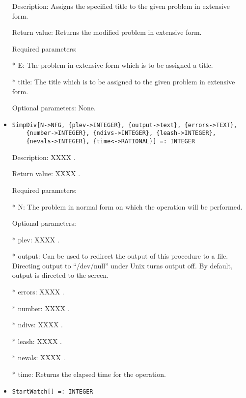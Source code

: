 \begin{itemize}
\bd
\item
[Description:] Assigns the specified title to the given problem in 
extensive form.
\item
[Return value:] Returns the modified problem in extensive form.
\item
[Required parameters:]\hfil\null
	
\bd
\item
[* E:] The problem in extensive form which is to be assigned a title.
\item
[* title:] The title which is to be assigned to the given problem in 
extensive form.
\ed

\item
[Optional parameters:] None.
\ed

\item
\begin{verbatim}
SimpDiv[N->NFG, {plev->INTEGER}, {output->text}, {errors->TEXT},
	{number->INTEGER}, {ndivs->INTEGER}, {leash->INTEGER}, 
	{nevals->INTEGER}, {time<->RATIONAL}] =: INTEGER
\end{verbatim}

\bd
\item
[Description:] XXXX .
\item
[Return value:] XXXX .
\item
[Required parameters:]\hfil\null

\bd
\item
[* N:] The problem in normal form on which the operation will be performed.
\ed

\item
[Optional parameters:]\hfil\null
	
\bd
\item
[* plev:]XXXX .
\item
[* output:] Can be used to redirect the output of this procedure to a
file.  Directing output to ``/dev/null'' under Unix turns 
output off.  By default, output is directed to the screen.
\item
[* errors:] XXXX .
\item
[* number:] XXXX .
\item 
[* ndivs:] XXXX .
\item
[* leash:] XXXX .
\item
[* nevals:] XXXX .
\item
[* time:] Returns the elapsed time for the operation.
\ed
\ed

\item

\begin{verbatim}
StartWatch[] =: INTEGER
\end{verbatim}


\end{itemize}
